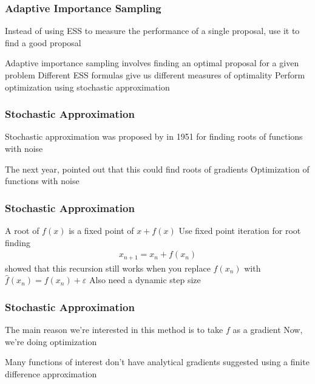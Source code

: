 \documentclass[14pt]{beamer}
\begin{document}
\begin{frame}
    \frametitle{Adaptive Importance Sampling}

    \begin{outline}
        \1 Instead of using ESS to measure the performance of a single proposal, use it to find a good proposal \newline

        \1 Adaptive importance sampling involves finding an optimal proposal for a given problem
            \2 Different ESS formulas give us different measures of optimality
        \1 Perform optimization using stochastic approximation
    \end{outline}
\end{frame}


{



\begin{frame}
    \frametitle{Stochastic Approximation}

    \begin{outline}
        \1 Stochastic approximation was proposed by \citeauthor{Rob51} in 1951 for finding roots of functions with noise \newline

        \1 The next year, \citeauthor{Kie52} pointed out that this could find roots of gradients
            \2 Optimization of functions with noise
    \end{outline}
\end{frame}


\begin{frame}
    \frametitle{Stochastic Approximation}

    \begin{outline}
        \1 A root of $f(x)$ is a fixed point of $x + f(x)$
            \2 Use fixed point iteration for root finding
        \begin{gather*}
            x_{n+1} = x_n + f(x_n)
        \end{gather*}
        \1 \citeauthor{Rob51} showed that this recursion still works when you replace $f(x_n)$ with $\hat{f} (x_n) = f(x_n) + \varepsilon$
        \1 Also need a dynamic step size
    \end{outline}
 
\end{frame}


}


\begin{frame}
    \frametitle{Stochastic Approximation}
    \begin{outline}
        \1 The main reason we're interested in this method is to take $f$ as a gradient
            \2 Now, we're doing optimization \newline
        
        \1 Many functions of interest don't have analytical gradients
        \1 \citet{Kie52} suggested using a finite difference approximation
    \end{outline}
\end{frame}
\end{document}
